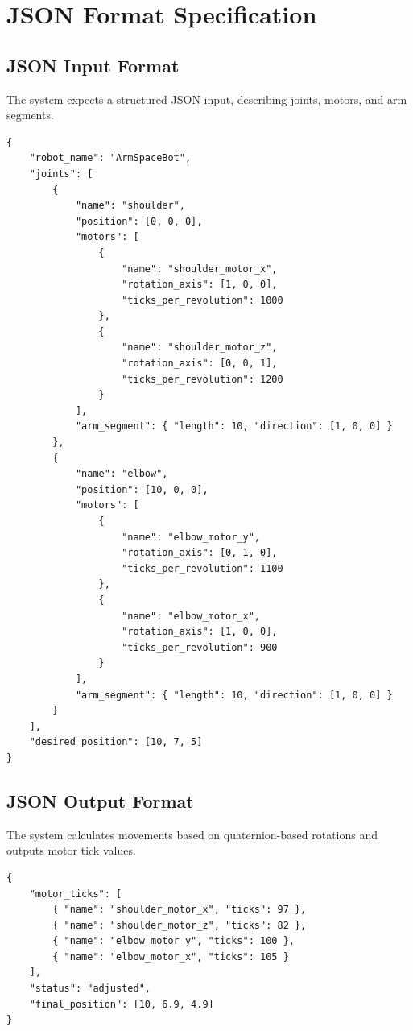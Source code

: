 \documentclass{article}
\begin{document}
\section{JSON Format Specification}
\subsection{JSON Input Format}
The system expects a structured JSON input, describing joints, motors, and arm segments.

\begin{verbatim}
{
    "robot_name": "ArmSpaceBot",
    "joints": [
        {
            "name": "shoulder",
            "position": [0, 0, 0],
            "motors": [
                {
                    "name": "shoulder_motor_x",
                    "rotation_axis": [1, 0, 0],
                    "ticks_per_revolution": 1000
                },
                {
                    "name": "shoulder_motor_z",
                    "rotation_axis": [0, 0, 1],
                    "ticks_per_revolution": 1200
                }
            ],
            "arm_segment": { "length": 10, "direction": [1, 0, 0] }
        },
        {
            "name": "elbow",
            "position": [10, 0, 0],
            "motors": [
                {
                    "name": "elbow_motor_y",
                    "rotation_axis": [0, 1, 0],
                    "ticks_per_revolution": 1100
                },
                {
                    "name": "elbow_motor_x",
                    "rotation_axis": [1, 0, 0],
                    "ticks_per_revolution": 900
                }
            ],
            "arm_segment": { "length": 10, "direction": [1, 0, 0] }
        }
    ],
    "desired_position": [10, 7, 5]
}
\end{verbatim}

\subsection{JSON Output Format}
The system calculates movements based on quaternion-based rotations and outputs motor tick values.

\begin{verbatim}
{
    "motor_ticks": [
        { "name": "shoulder_motor_x", "ticks": 97 },
        { "name": "shoulder_motor_z", "ticks": 82 },
        { "name": "elbow_motor_y", "ticks": 100 },
        { "name": "elbow_motor_x", "ticks": 105 }
    ],
    "status": "adjusted",
    "final_position": [10, 6.9, 4.9]
}
\end{verbatim}
\end{document}
